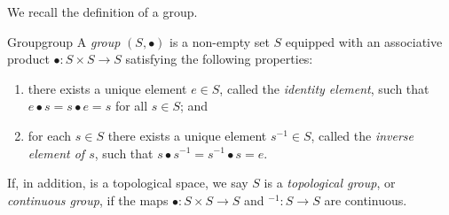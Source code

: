 We recall the definition of a group.
\begin{definition}{Group}{group}
    A \emph{group} \((S, \bullet)\) is a non-empty set \(S\) equipped with an associative product \(\bullet : S \times S \to S\) satisfying the following properties:
    \begin{enumerate}[label=(\alph*)]
        \item there exists a unique element \(e \in S\), called the \emph{identity element}, such that \(e\bullet s = s \bullet e = s\) for all \(s \in S\); and
        \item for each \(s \in S\) there exists a unique element \(s^{-1} \in S\), called the \emph{inverse element of \(s\)}, such that \(s \bullet s^{-1} = s^{-1} \bullet s = e\).
    \end{enumerate}
    If, in addition,  is a topological space, we say \(S\) is a \emph{topological group}, or \emph{continuous group}, if the maps \(\bullet : S \times S \to S\) and \(^{-1} : S \to S\) are continuous.
\end{definition}


